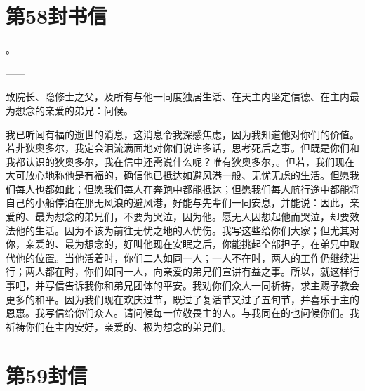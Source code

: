 \section{第58封书信}

。\par

——\par

致院长、隐修士之父，及所有与他一同度独居生活、在天主内坚定信德、在主内最为想念的亲爱的弟兄：问候。\par

我已听闻有福的逝世的消息，这消息令我深感焦虑，因为我知道他对你们的价值。若非狄奥多尔，我定会泪流满面地对你们说许多话，思考死后之事。但既是你们和我都认识的狄奥多尔，我在信中还需说什么呢？唯有狄奥多尔，。但若，我们现在大可放心地称他是有福的，确信他已抵达如避风港一般、无忧无虑的生活。但愿我们每人也都如此；但愿我们每人在奔跑中都能抵达；但愿我们每人航行途中都能将自己的小船停泊在那无风浪的避风港，好能与先辈们一同安息，并能说：因此，亲爱的、最为想念的弟兄们，不要为哭泣，因为他。愿无人因想起他而哭泣，却要效法他的生活。因为不该为前往无忧之地的人忧伤。我写这些给你们大家；但尤其对你，亲爱的、最为想念的，好叫他现在安眠之后，你能挑起全部担子，在弟兄中取代他的位置。当他活着时，你们二人如同一人；一人不在时，两人的工作仍继续进行；两人都在时，你们如同一人，向亲爱的弟兄们宣讲有益之事。所以，就这样行事吧，并写信告诉我你和弟兄团体的平安。我劝你们众人一同祈祷，求主赐予教会更多的和平。因为我们现在欢庆过节，既过了复活节又过了五旬节，并喜乐于主的恩惠。我写信给你们众人。请问候每一位敬畏主的人。与我同在的也问候你们。我祈祷你们在主内安好，亲爱的、极为想念的弟兄们。\par



\section{第59封信}

